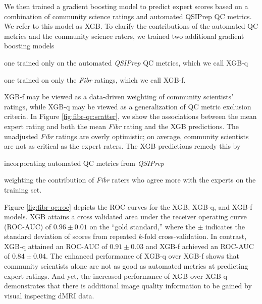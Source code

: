 \documentclass[fleqn,10pt]{wlscirep}
\begin{document}
We then trained a gradient boosting model \cite{chen2016-eb} to predict expert
scores based on a combination of community science ratings and automated QSIPrep
QC metrics. We refer to this model as XGB.  To clarify the contributions of the
automated QC metrics and the community science raters, we trained two additional
gradient boosting models
\begin{enumerate*}[%
    label=(\roman*),%
    before=\unskip{: },%
    itemjoin={{, }},%
    itemjoin*={{ and }}]
    \item one trained only on the automated \emph{QSIPrep} QC metrics, which we
    call XGB-q
    \item one trained on only the \emph{Fibr} ratings, which we call XGB-f.
\end{enumerate*}
XGB-f may be viewed as a data-driven weighting of community scientists' ratings,
while XGB-q may be viewed as a generalization of QC metric exclusion criteria.
In Figure \ref{fig:fibr-qc:scatter}, we show the associations between the mean
expert rating and both the mean \emph{Fibr} rating and the XGB predictions.  The
unadjusted \emph{Fibr} ratings are overly optimistic; on average, community
scientists are not as critical as the expert raters. The XGB predictions remedy
this by
\begin{enumerate*}[%
    label=(\roman*),%
    before={{ }},%
    itemjoin={{, }},%
    itemjoin*={{ and }}]
    \item incorporating automated QC metrics from \emph{QSIPrep}
    \item weighting the contribution of \emph{Fibr} raters who agree more with
    the experts on the training set.
\end{enumerate*}
Figure \ref{fig:fibr-qc:roc} depicts the ROC curves for the XGB, XGB-q, and
XGB-f models.
XGB attains a cross validated area under the receiver operating curve (ROC-AUC) of
$0.96 \pm 0.01$ on the ``gold standard,'' where the $\pm$ indicates the standard
deviation of scores from repeated $k$-fold cross-validation.
In contrast, XGB-q attained an ROC-AUC of $0.91 \pm 0.03$ and XGB-f achieved an
ROC-AUC of $0.84 \pm 0.04$.
The enhanced performance of XGB-q over XGB-f shows that community scientists
alone are not as good as automated metrics at predicting expert ratings. And
yet, the increased performance of XGB over XGB-q demonstrates that there is
additional image quality information to be gained by visual inspecting dMRI
data.
\end{document}
